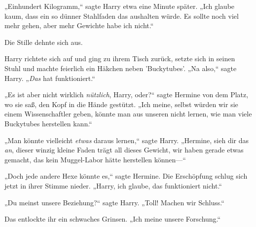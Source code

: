„Einhundert Kilogramm,“ sagte Harry etwa eine Minute später. „Ich glaube kaum, dass ein so dünner Stahlfaden das aushalten würde. Es sollte noch viel mehr gehen, aber mehr Gewichte habe ich nicht.“

Die Stille dehnte sich aus.

Harry richtete sich auf und ging zu ihrem Tisch zurück, setzte sich in seinen Stuhl und machte feierlich ein Häkchen neben 'Buckytubes'. „Na also,“ sagte Harry. „\emph{Das} hat funktioniert.“

„Es ist aber nicht wirklich \emph{nützlich}, Harry, oder?“ sagte Hermine von dem Platz, wo sie saß, den Kopf in die Hände gestützt. „Ich meine, selbst würden wir sie einem Wissenschaftler geben, könnte man aus unseren nicht lernen, wie man viele Buckytubes herstellen kann.“

„Man könnte vielleicht \emph{etwas} daraus lernen,“ sagte Harry. „Hermine, sieh dir das \emph{an}, dieser winzig kleine Faden trägt all dieses Gewicht, wir haben gerade etwas gemacht, das kein Muggel-Labor hätte herstellen können—“

„Doch jede andere Hexe könnte es,“ sagte Hermine. Die Erschöpfung schlug sich jetzt in ihrer Stimme nieder. „Harry, ich glaube, das funktioniert nicht.“

„Du meinst unsere Beziehung?“ sagte Harry. „Toll! Machen wir Schluss.“

Das entlockte ihr ein schwaches Grinsen. „Ich meine unsere Forschung.“

